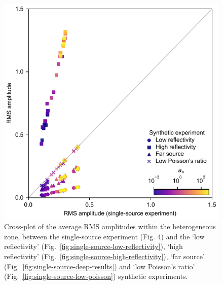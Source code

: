\documentclass[se,manuscript]{copernicus}
\begin{document}
\begin{figure}
    \includegraphics{figures/si_fig15.pdf}
    \caption{Cross-plot of the average RMS amplitudes within the heterogeneous zone, between the single-source experiment (Fig. 4) and the `low reflectivity' (Fig.~\ref{fig:single-source-low-reflectivity}), `high reflectivity' (Fig.~\ref{fig:single-source-high-reflectivity}), `far source' (Fig.~\ref{fig:single-source-deep-results}) and `low Poisson's ratio' (Fig.~\ref{fig:single-source-low-poisson}) synthetic experiments.}
    \label{fig:single-source-xplot} 
\end{figure}

\clearpage
\end{document}
